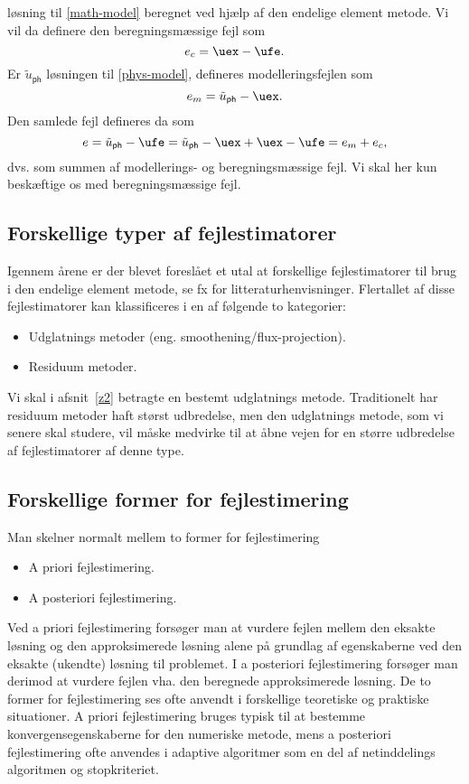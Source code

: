 løsning til \eqref{math-model} beregnet ved hjælp af den endelige 
element metode. Vi vil da definere den beregningsmæssige fejl som
\begin{equation}
  e_c = \uex - \ufe .
\end{equation}
Er $\tilde{u}_{\mathsf{ph}}$ løsningen til \eqref{phys-model}, 
defineres modelleringsfejlen som 
\begin{equation}
  e_m = \tilde{u}_{\mathsf{ph}} - \uex .
\end{equation}
Den samlede fejl defineres da som 
\begin{equation}
  e=\tilde{u}_{\mathsf{ph}}-\ufe=\tilde{u}_{\mathsf{ph}}-\uex+\uex-\ufe
  =e_m + e_c ,
\end{equation}
dvs. som summen af modellerings- og beregningsmæssige fejl.
Vi skal her  kun beskæftige os med beregningsmæssige fejl. 

\subsection{Forskellige typer af fejlestimatorer}
Igennem årene er der blevet foreslået et utal at forskellige 
fejlestimatorer til brug i den endelige element metode, se fx
\cite{babuska1} for 
litteraturhenvisninger. Flertallet af disse fejlestimatorer kan 
klassificeres i en af følgende to kategorier:
\begin{itemize}
  \item Udglatnings metoder (eng. smoothening/flux-projection).
  \item Residuum metoder.
\end{itemize}
Vi skal i afsnit~\ref{z2} betragte en bestemt udglatnings metode.
Traditionelt har residuum metoder haft størst udbredelse, men den
udglatnings metode, som vi senere skal studere, vil måske medvirke til at åbne
vejen for en større udbredelse af fejlestimatorer af denne type.
 
\subsection{Forskellige former for fejlestimering}
Man skelner normalt mellem to former for fejlestimering
\begin{itemize}
  \item A priori fejlestimering.
  \item A posteriori fejlestimering.
\end{itemize}
Ved a priori fejlestimering forsøger man at vurdere fejlen mellem den
eksakte løsning og den approksimerede løsning alene på grundlag af
egenskaberne ved den eksakte (ukendte) løsning til problemet. I a 
posteriori fejlestimering forsøger man derimod at vurdere fejlen vha. 
den beregnede approksimerede løsning. De to former for fejlestimering 
ses ofte anvendt i forskellige teoretiske og praktiske situationer. A
priori fejlestimering bruges typisk til at bestemme 
konvergensegenskaberne for den numeriske metode, mens a posteriori
fejlestimering ofte anvendes i adaptive algoritmer som en del af
netinddelings algoritmen og stopkriteriet.

